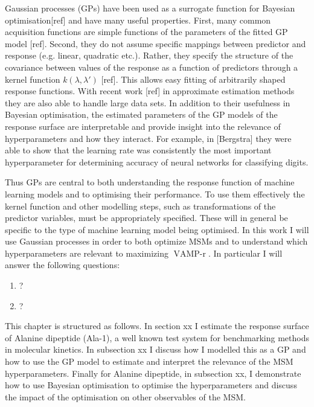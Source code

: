 Gaussian processes (GPs) have been used as a surrogate function for Bayesian optimisation[ref] and have many useful properties. First, many common acquisition functions are simple functions of the parameters of the fitted GP model [ref]. Second, they do not assume specific mappings between predictor and response (e.g. linear, quadratic etc.). Rather, they specify the structure of the covariance between values of the response as a function of predictors through a kernel function $k(\lambda, \lambda')$ [ref]. This allows easy fitting of arbitrarily shaped response functions.  With recent work [ref] in approximate estimation methods they are also able to handle large data sets. In addition to their usefulness in Bayesian optimisation, the estimated parameters of the GP models of the response surface are interpretable and provide insight into the relevance of hyperparameters and how they interact.  For example, in [Bergstra] they were able to show that the learning rate was consistently the most important hyperparameter for determining accuracy of neural networks for classifying digits. 


Thus GPs are central to both understanding the response function of machine learning models and to optimising their performance. To use them effectively the kernel function and other modelling steps, such as transformations of the predictor variables, must be appropriately specified. These will in general be specific to the type of machine learning model being optimised.  In this work  I will use Gaussian processes in order to both optimize MSMs and to understand which hyperparameters are relevant to maximizing $\operatorname{VAMP-r}$.  In particular I will answer the following questions: 

\begin{enumerate}
    \item ?
    \item ?
\end{enumerate}

This chapter is structured as follows. In section xx I estimate the response surface of Alanine dipeptide (Ala-1), a well known test system for benchmarking methods in molecular kinetics. In subsection xx I discuss how I modelled this as a GP and how to use the GP model to estimate and interpret the relevance of the MSM hyperparameters. Finally for Alanine dipeptide, in subsection xx, I demonstrate how to use Bayesian optimisation to optimise the hyperparameters and discuss the impact of the optimisation on other observables of the MSM. 

